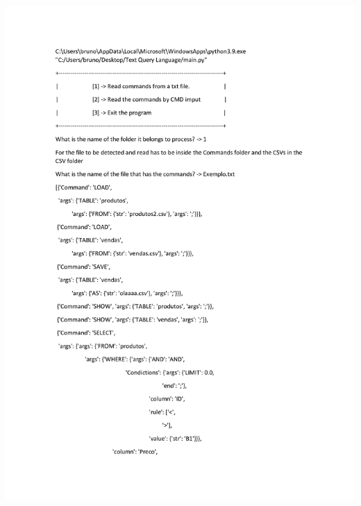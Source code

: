 \documentclass{article}
\begin{document}
\noindent
\includegraphics[width=1.3\textwidth]{0}
\end{document}

